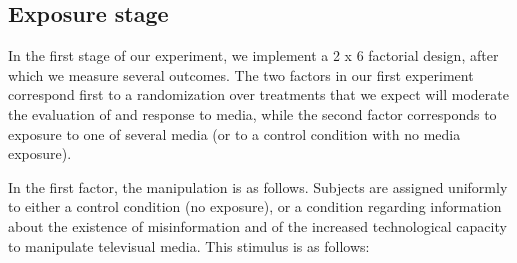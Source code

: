\documentclass[12pt,letterpaper]{article}
\begin{document}

\subsection{Exposure stage}

In the first stage of our experiment, we implement a 2 x 6 factorial design, after which we measure several outcomes. %
The two factors in our first experiment correspond first to a randomization over treatments that we expect will moderate the evaluation of and response to media, while the second factor corresponds to exposure to one of several media (or to a control condition with no media exposure).

In the first factor, the manipulation is as follows. Subjects are assigned uniformly to either a control condition (no exposure), or a condition regarding information about the existence of misinformation and of the increased technological capacity to manipulate televisual media. This stimulus is as follows: \\

\begin{framed}
\end{framed}
 \\
\end{document}
